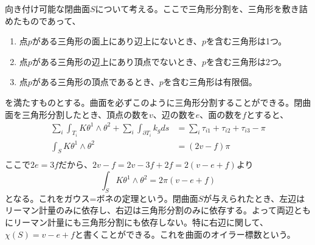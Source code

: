         向き付け可能な閉曲面$S$について考える。ここで三角形分割を、三角形を敷き詰めたものであって、
        \begin{enumerate}
            \item 点$p$がある三角形の面上にあり辺上にないとき、$p$を含む三角形は1つ。
            \item 点$p$がある三角形の辺上にあり頂点でないとき、$p$を含む三角形は2つ。
            \item 点$p$がある三角形の頂点であるとき、$p$を含む三角形は有限個。
        \end{enumerate}
        を満たすものとする。曲面を必ずこのように三角形分割することができる。閉曲面を三角形分割したとき、頂点の数を$v$、辺の数を$e$、面の数を$f$とすると、
        \begin{align*}
            \sum_i \int_{T_i} K\theta^1 \wedge \theta^2 + \sum_i \int_{\partial T_i} k_gds &= \sum_i \tau_{i1} + \tau_{i2} + \tau_{i3} - \pi\\
            \int_S K\theta^1 \wedge \theta^2 &= (2v - f)\pi\\
        \end{align*}
        ここで$2e = 3f$だから、$2v - f = 2v - 3f + 2f = 2(v - e + f)$より
            \[\int_S K\theta^1 \wedge \theta^2 = 2\pi(v - e + f)\]
        となる。これをガウス=ボネの定理という。閉曲面$S$が与えられたとき、左辺はリーマン計量のみに依存し、右辺は三角形分割のみに依存する。よって両辺ともにリーマン計量にも三角形分割にも依存しない。特に右辺に関して、$\chi(S) = v - e + f$と書くことができる。これを曲面のオイラー標数という。